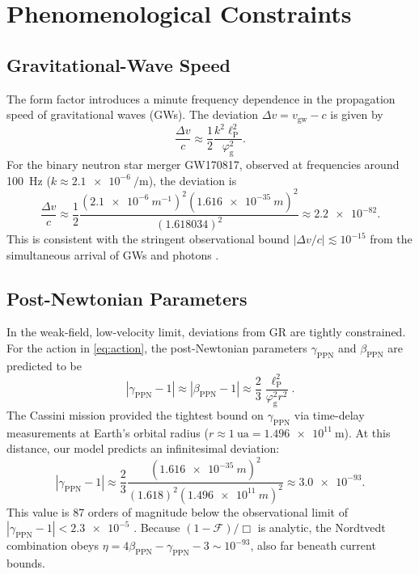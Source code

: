 \documentclass[
  10pt,prd,aps,twocolumn,superscriptaddress,
  nofootinbib,floatfix,tightenlines
]{revtex4-2}
\newcommand{\ellP}{\ell_{\mathrm{P}}}
\newcommand{\phig}{\varphi_{\mathrm{g}}} %
\newcommand{\Fop}{\mathscr{F}}
\newcommand{\BOX}{\Box}
\newcommand{\ppnGamma}{\gamma_{\mathrm{PPN}}}
\newcommand{\ppnBeta}{\beta_{\mathrm{PPN}}}
\begin{document}
\section{Phenomenological Constraints}
\label{sec:constraints}
\subsection{Gravitational-Wave Speed}
The form factor introduces a minute frequency dependence in the propagation speed of gravitational waves (GWs). The deviation \(\Delta v = v_{\text{gw}} - c\) is given by
\begin{equation}
\frac{\Delta v}{c} \approx \frac{1}{2}\frac{k^2\ellP^2}{\phig^2}.
\label{eq:dv}
\end{equation}
For the binary neutron star merger GW170817, observed at frequencies around \SI{100}{\hertz} (\(k \approx \SI{2.1e-6}{\per\meter}\)), the deviation is
\begin{equation}
\frac{\Delta v}{c} \approx \frac{1}{2} \frac{(\SI{2.1e-6}{m^{-1}})^2 (\SI{1.616e-35}{m})^2}{(1.618034)^2} \approx \num{2.2e-82}.
\end{equation}
This is consistent with the stringent observational bound \(|\Delta v/c| \lesssim 10^{-15}\) from the simultaneous arrival of GWs and photons \cite{Abbott:2017}.

\subsection{Post-Newtonian Parameters}
In the weak-field, low-velocity limit, deviations from GR are tightly constrained. For the action in \cref{eq:action}, the post-Newtonian parameters \(\ppnGamma\) and \(\ppnBeta\) are predicted to be
\begin{equation}
|\ppnGamma-1| \approx |\ppnBeta-1| \approx \frac{2}{3}\frac{\ellP^2}{\phig^2 r^2}.
\label{eq:ppn}
\end{equation}
The Cassini mission provided the tightest bound on \(\ppnGamma\) via time-delay measurements at Earth's orbital radius (\(r \approx \SI{1}{\astronomicalunit} = \SI{1.496e11}{\meter}\)). At this distance, our model predicts an infinitesimal deviation:
\begin{equation}
|\ppnGamma-1| \approx \frac{2}{3}\frac{(\SI{1.616e-35}{m})^2}{(\SI{1.618})^2(\SI{1.496e11}{m})^2} \approx \num{3.0e-93}.
\end{equation}
This value is 87 orders of magnitude below the observational limit of \(|\ppnGamma-1|<\num{2.3e-5}\) \cite{Bertotti:2003}. Because \((1-\Fop)/\BOX\) is analytic, the Nordtvedt combination obeys \(\eta = 4\ppnBeta - \ppnGamma - 3 \sim 10^{-93}\), also far beneath current bounds.
\end{document}
